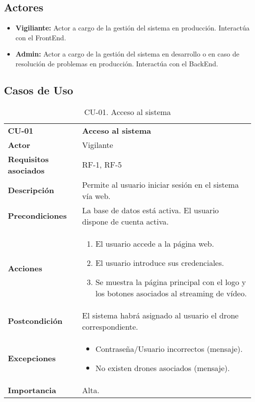 \subsection{Actores}

\begin{itemize}
\item \textbf{Vigiliante:} Actor a cargo de la gestión del sistema en producción. Interactúa con el FrontEnd.
\item \textbf{Admin:} Actor a cargo de la gestión del sistema en desarrollo o en caso de resolución de problemas en producción. Interactúa con el BackEnd.
\end{itemize}

\subsection{Casos de Uso}

\begin{table}[H]
	\begin{center}
		\begin{tabular}{m{3cm} | m{10cm}}\hline
			\toprule
			\textbf{CU-01} & \textbf{Acceso al sistema}\\
			\otoprule
			\textbf{Actor} & Vigilante\\
			\textbf{Requisitos asociados} & RF-1, RF-5\\
			\textbf{Descripción} & Permite al usuario iniciar sesión en el sistema vía web.\\
			\textbf{Precondiciones} & La base de datos está activa. El usuario dispone de cuenta activa.\\
			\textbf{Acciones} & \begin{enumerate}
											\item El usuario accede a la página web.
											\item El usuario introduce sus credenciales.
											\item Se muestra la página principal con el logo y los botones asociados al streaming de vídeo.
											\end{enumerate}\\
			
			\textbf{Postcondición} & El sistema habrá asignado al usuario el drone correspondiente. \\
			\textbf{Excepciones} & \begin{itemize}
												\item Contraseña/Usuario incorrectos (mensaje).
												\item No existen drones asociados (mensaje).
												\end{itemize}\\
			\textbf{Importancia} & Alta.\\
			\hline
			\bottomrule
		\end{tabular}
		\caption{CU-01. Acceso al sistema}
		\label{tb:CU01}
	\end{center}
\end{table}



